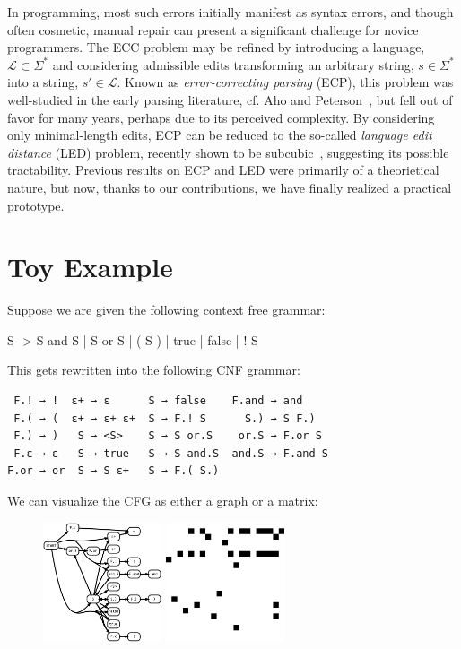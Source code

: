 \documentclass[sigplan,nonacm]{acmart}\settopmatter{printfolios=false,printccs=false,printacmref=false}
\begin{document}
In programming, most such errors initially manifest as syntax errors, and though often cosmetic, manual repair can present a significant challenge for novice programmers. The ECC problem may be refined by introducing a language, $\mathcal{L} \subset \Sigma^*$ and considering admissible edits transforming an arbitrary string, $s \in \Sigma^*$ into a string, $s'\in\mathcal{L}$. Known as \textit{error-correcting parsing} (ECP), this problem was well-studied in the early parsing literature, cf. Aho and Peterson~\cite{aho1972minimum}, but fell out of favor for many years, perhaps due to its perceived complexity. By considering only minimal-length edits, ECP can be reduced to the so-called \textit{language edit distance} (LED) problem, recently shown to be subcubic~\cite{bringmann2019truly}, suggesting its possible tractability. Previous results on ECP and LED were primarily of a theorietical nature, but now, thanks to our contributions, we have finally realized a practical prototype.

%

\section{Toy Example}

Suppose we are given the following context free grammar:

\begin{tidyinput}
S -> S and S | S or S | ( S ) | true | false | ! S
\end{tidyinput}

\noindent This gets rewritten into the following CNF grammar:

\begin{verbatim}
 F.! → !  ε+ → ε      S → false    F.and → and
 F.( → (  ε+ → ε+ ε+  S → F.! S      S.) → S F.)
 F.) → )   S → <S>    S → S or.S    or.S → F.or S
 F.ε → ε   S → true   S → S and.S  and.S → F.and S
F.or → or  S → S ε+   S → F.( S.)
\end{verbatim}

\noindent We can visualize the CFG as either a graph or a matrix:

\begin{figure}[H]
    \includegraphics[width=3.5cm]{../figures/bool_arith_cfg_graph.png}
    \hspace{20pt}
    \includegraphics[width=3.5cm]{../figures/bool_arith_cfg_mat.bmp}
\end{figure}
\end{document}
